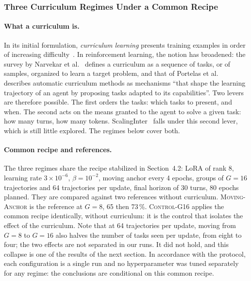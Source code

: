 \documentclass[11pt,a4paper]{article}
\begin{document}
\subsubsection{Three Curriculum Regimes Under a Common Recipe}

\paragraph{What a curriculum is.} In its initial formulation, \emph{curriculum learning} presents training examples in order of increasing difficulty~\cite{bengio2009curriculum}. In reinforcement learning, the notion has broadened: the survey by Narvekar et al.~\cite{narvekar2020curriculum} defines a curriculum as a sequence of tasks, or of samples, organized to learn a target problem, and that of Portelas et al.~\cite{portelas2020acl} describes automatic curriculum methods as mechanisms ``that shape the learning trajectory of an agent by proposing tasks adapted to its capabilities''. Two levers are therefore possible. The first orders the tasks: which tasks to present, and when. The second acts on the means granted to the agent to solve a given task: how many turns, how many tokens. ScalingInter~\cite{xi_agentgym-rl_2025} falls under this second lever, which is still little explored. The regimes below cover both.

\paragraph{Common recipe and references.} The three regimes share the recipe stabilized in Section~4.2: LoRA of rank 8, learning rate $3 \times 10^{-6}$, $\beta = 10^{-2}$, moving anchor every 4 epochs, groups of $G=16$ trajectories and 64 trajectories per update, final horizon of 30 turns, 80 epochs planned. They are compared against two references without curriculum. \textsc{Moving-Anchor} is the reference at $G=8$, 65 then 73\,\%. \textsc{Control-G16} applies the common recipe identically, without curriculum: it is the control that isolates the effect of the curriculum. Note that at 64 trajectories per update, moving from $G=8$ to $G=16$ also halves the number of tasks seen per update, from eight to four; the two effects are not separated in our runs. It did not hold, and this collapse is one of the results of the next section. In accordance with the protocol, each configuration is a single run and no hyperparameter was tuned separately for any regime: the conclusions are conditional on this common recipe.
\end{document}
